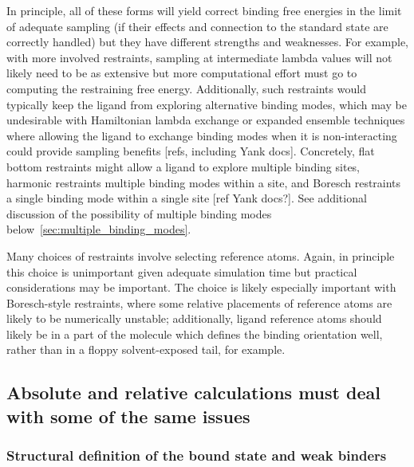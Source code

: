 \documentclass[9pt,bestpractices]{livecoms}
\begin{document}
In principle, all of these forms will yield correct binding free energies in the limit of adequate sampling (if their effects and connection to the standard state are correctly handled) but they have different strengths and weaknesses.
For example, with more involved restraints, sampling at intermediate lambda values will not likely need to be as extensive but more computational effort must go to computing the restraining free energy.
Additionally, such restraints would typically keep the ligand from exploring alternative binding modes, which may be undesirable with Hamiltonian lambda exchange or expanded ensemble techniques where allowing the ligand to exchange binding modes when it is non-interacting could provide sampling benefits [refs, including Yank docs].
Concretely, flat bottom restraints might allow a ligand to explore multiple binding sites, harmonic restraints multiple binding modes within a site, and Boresch restraints a single binding mode within a single site [ref Yank docs?].
See additional discussion of the possibility of multiple binding modes below~\ref{sec:multiple_binding_modes}.

Many choices of restraints involve selecting reference atoms.
Again, in principle this choice is unimportant given adequate simulation time but practical considerations may be important.
The choice is likely especially important with Boresch-style restraints, where some relative placements of reference atoms are likely to be numerically unstable; additionally, ligand reference atoms should likely be in a part of the molecule which defines the binding orientation well, rather than in a floppy solvent-exposed tail, for example.



\subsection{Absolute and relative calculations must deal with some of the same issues}

\subsubsection{Structural definition of the bound state and weak binders}
\end{document}
